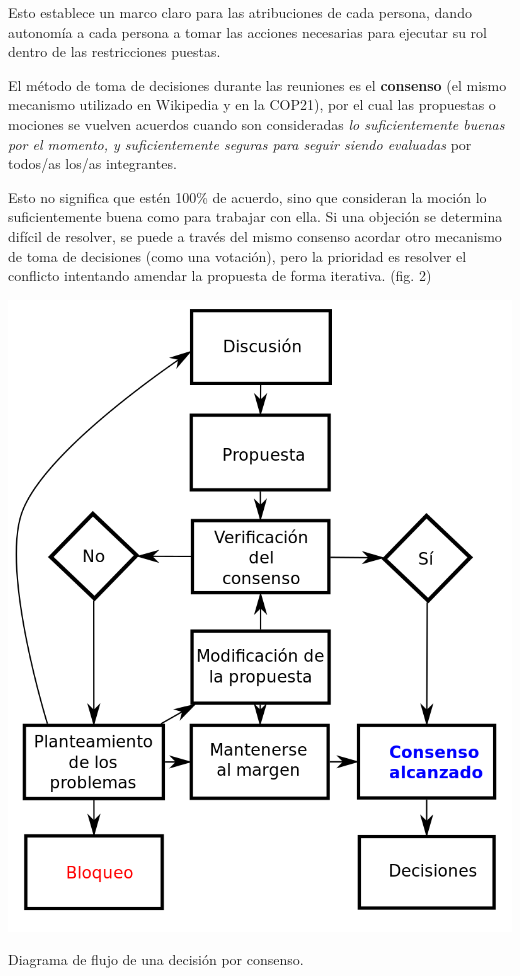\documentclass[justified]{tufte-handout} %
\begin{document}
Esto establece un marco claro para las atribuciones de cada persona, dando autonomía a cada persona a tomar las acciones necesarias para ejecutar su rol dentro de las restricciones puestas.

El método de toma de decisiones durante las reuniones es el \textbf{consenso} (el mismo mecanismo utilizado en Wikipedia y en la COP21), por el cual las propuestas o mociones se vuelven acuerdos cuando son consideradas \textit{lo suficientemente buenas por el momento, y suficientemente seguras para seguir
siendo evaluadas} por todos/as los/as integrantes. 

Esto no significa que estén 100\% de acuerdo, sino que consideran la moción lo suficientemente buena como para trabajar con ella. Si una objeción se determina difícil de resolver, se puede a través del mismo consenso acordar otro mecanismo de toma de decisiones (como una votación), pero la prioridad es resolver el conflicto intentando amendar la propuesta de forma iterativa. (fig. 2)
\begin{marginfigure}[-400px]
	\includegraphics[width=\linewidth]{consenso.png}
	\caption{Diagrama de flujo de una decisión por consenso.}
	\label{fig:consenso}
\end{marginfigure}
\end{document}
